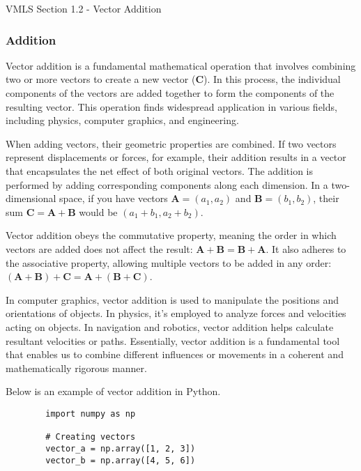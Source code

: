 \begin{notes}{VMLS Section 1.2 - Vector Addition}
    \subsubsection*{Addition}

    Vector addition is a fundamental mathematical operation that involves combining two or more vectors to create a new vector ($\mathbf{C}$). In this process, the individual components of the vectors are 
    added together to form the components of the resulting vector. This operation finds widespread application in various fields, including physics, computer graphics, and engineering.

    When adding vectors, their geometric properties are combined. If two vectors represent displacements or forces, for example, their addition results in a vector that encapsulates the net effect of both 
    original vectors. The addition is performed by adding corresponding components along each dimension. In a two-dimensional space, if you have vectors $\mathbf{A} = (a_1, a_2)$ and $\mathbf{B} = (b_1, b_2)$, 
    their sum $\mathbf{C} = \mathbf{A} + \mathbf{B}$ would be $(a_1 + b_1, a_2 + b_2)$.  
    
    Vector addition obeys the commutative property, meaning the order in which vectors are added does not affect the result: $\mathbf{A} + \mathbf{B} = \mathbf{B} + \mathbf{A}$. It also adheres to the associative 
    property, allowing multiple vectors to be added in any order: $(\mathbf{A} + \mathbf{B}) + \mathbf{C} = \mathbf{A} + (\mathbf{B} + \mathbf{C})$.
    
    In computer graphics, vector addition is used to manipulate the positions and orientations of objects. In physics, it's employed to analyze forces and velocities acting on objects. In navigation and robotics, 
    vector addition helps calculate resultant velocities or paths. Essentially, vector addition is a fundamental tool that enables us to combine different influences or movements in a coherent and mathematically 
    rigorous manner.

    \begin{Highlight}
        Below is an example of vector addition in Python.

        \begin{verbatim}
        import numpy as np

        # Creating vectors
        vector_a = np.array([1, 2, 3])
        vector_b = np.array([4, 5, 6])
        

\end{verbatim}
\end{Highlight}
\end{notes}
